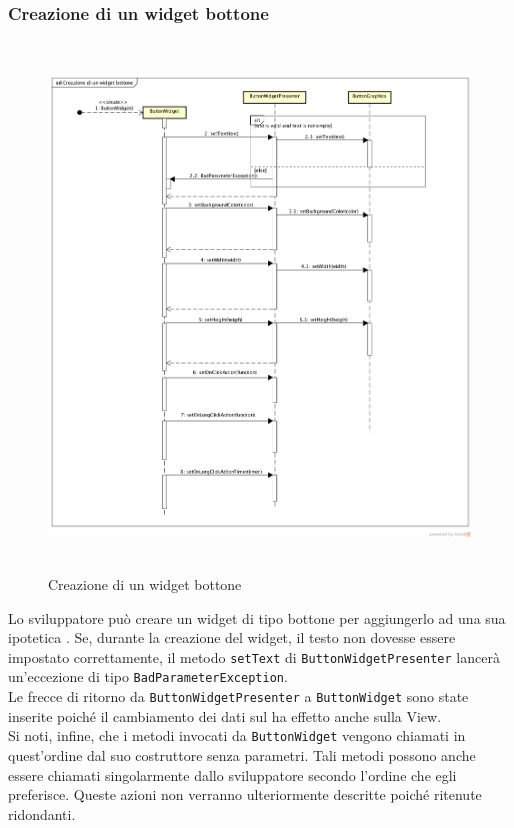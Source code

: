 \subsubsection{Creazione di un widget bottone}

\label{Creazione di un widget bottone}
\begin{figure}[H]
	\centering
	\includegraphics[width=16cm, height=14cm]{Sezioni/Diagrammi/SDK/Creazione di un widget bottone.png}
	\caption{Creazione di un widget bottone}
\end{figure}

Lo sviluppatore può creare un widget di tipo bottone per aggiungerlo ad una sua ipotetica . Se, durante la creazione del widget, il testo non dovesse essere impostato correttamente, il metodo \texttt{setText} di \texttt{ButtonWidgetPresenter} lancerà un'eccezione di tipo \texttt{BadParameterException}. \\
Le frecce di ritorno da \texttt{ButtonWidgetPresenter}  a \texttt{ButtonWidget} sono state inserite poiché il cambiamento dei dati sul  ha effetto anche sulla View. \\
Si noti, infine, che i metodi invocati da \texttt{ButtonWidget} vengono chiamati in quest'ordine dal suo costruttore senza parametri. Tali metodi possono anche essere chiamati singolarmente dallo sviluppatore secondo l'ordine che egli preferisce. Queste azioni non verranno ulteriormente descritte poiché ritenute ridondanti.

